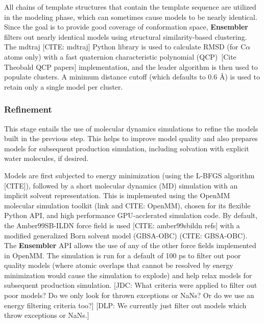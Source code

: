 \documentclass[aps,pre,twocolumn,nofootinbib,superscriptaddress,linenumbers]{revtex4-1}
\begin{document}
All chains of template structures that contain the template sequence are utilized in the modeling phase, which can sometimes cause models to be nearly identical.
Since the goal is to provide good coverage of conformation space, {\bf Ensembler} filters out nearly identical models using structural similarity-based clustering.
The mdtraj {\color{red}[CITE: mdtraj]} Python library is used to calculate RMSD (for C$\alpha$ atoms only) with a fast quaternion characteristic polynomial (QCP)~{\color{red}[Cite Theobald QCP papers]} implementation, and the leader algorithm is then used to populate clusters.
A minimum distance cutoff (which defaults to 0.6 \AA) is used to retain only a single model per cluster.

\subsubsection{Refinement}

This stage entails the use of molecular dynamics simulations to refine the models built in the previous step.
This helps to improve model quality and also prepares models for subsequent production simulation, including solvation with explicit water molecules, if desired.

Models are first subjected to energy minimization (using the L-BFGS algorithm {\color{red}[CITE]}), followed by a short molecular dynamics (MD) simulation with an implicit solvent representation.
This is implemented using the OpenMM molecular simulation toolkit (link and CITE: OpenMM), chosen for its flexible Python API, and high performance GPU-acclerated simulation code.
By default, the Amber99SB-ILDN force field is used {\color{red}[CITE: amber99sbildn refs]} with a modified generalized Born solvent model (GBSA-OBC) (CITE: GBSA-OBC).
The {\bf Ensembler} API allows the use of any of the other force fields implemented in OpenMM.
The simulation is run for a default of 100 ps to filter out poor quality models (where atomic overlaps that cannot be resolved by energy minimization would cause the simulation to explode) and help relax models for subsequent production simulation.
{\color{red}[JDC: What criteria were applied to filter out poor models?  Do we only look for thrown exceptions or NaNs?  Or do we use an energy filtering criteria too?]}
{\color{blue}[DLP: We currently just filter out models which throw exceptions or NaNs.]}
\end{document}

